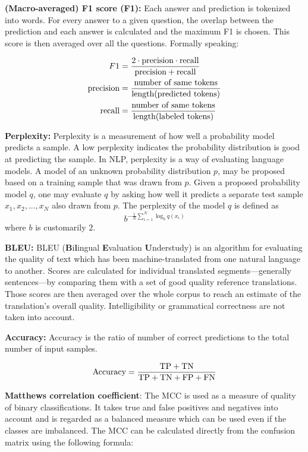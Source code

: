 \documentclass[]{krantz}
\begin{document}
\textbf{(Macro-averaged) F1 score (F1):} Each answer and prediction is tokenized into words. For every answer to a given question, the overlap between the prediction and each answer is calculated and the maximum F1 is chosen. This score is then averaged over all the questions. Formally speaking:

\[
\begin{aligned}
F1 &= \frac{2 \cdot \hbox{precision}\cdot\hbox{recall}}{\hbox{precision}+\hbox{recall}} \\
\hbox{precision} &= \frac{\hbox{number of same tokens}}{\hbox{length(predicted tokens)}} \\
\hbox{recall} &= \frac{\hbox{number of same tokens}}{\hbox{length(labeled tokens)}} 
\end{aligned}
\]

\textbf{Perplexity:} Perplexity is a measurement of how well a probability model predicts a sample. A low perplexity indicates the probability distribution is good at predicting the sample. In NLP, perplexity is a way of evaluating language models. A model of an unknown probability distribution \(p\), may be proposed based on a training sample that was drawn from \(p\). Given a proposed probability model \(q\), one may evaluate \(q\) by asking how well it predicts a separate test sample \(x_1, x_2, ..., x_N\) also drawn from \(p\). The perplexity of the model \(q\) is defined as
\[ b^{-\frac{1}{N}\sum_{i=1}^N\log_bq(x_i)} \]
where \(b\) is customarily \(2\). \citep{martinc2019supervised}

\textbf{BLEU:} BLEU (\textbf{B}i\textbf{l}ingual \textbf{E}valuation \textbf{U}nderstudy) is an algorithm for evaluating the quality of text which has been machine-translated from one natural language to another. Scores are calculated for individual translated segments---generally sentences---by comparing them with a set of good quality reference translations. Those scores are then averaged over the whole corpus to reach an estimate of the translation's overall quality. Intelligibility or grammatical correctness are not taken into account. \citep{papineni2002bleu}

\textbf{Accuracy:} Accuracy is the ratio of number of correct predictions to the total number of input samples.

\[\hbox{Accuracy}=\frac{\hbox{TP}+\hbox{TN}}{\hbox{TP}+\hbox{TN}+\hbox{FP}+\hbox{FN}}\]

\textbf{Matthews correlation coefficient}: The MCC is used as a measure of quality of binary classifications. It takes true and false positives and negatives into account and is regarded as a balanced measure which can be used even if the classes are imbalanced. The MCC can be calculated directly from the confusion matrix using the following formula:
\end{document}
